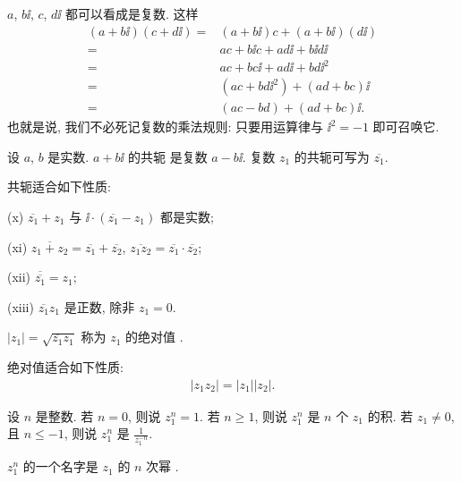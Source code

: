 \begin{remark}
    $a$, $b\ii$, $c$, $d\ii$ 都可以看成是复数. 这样
    \begin{align*}
        (a + b \ii) (c + d \ii)
        = {} & (a + b \ii) c + (a + b \ii) (d \ii)  \\
        = {} & ac + b \ii c + a d \ii + b \ii d \ii \\
        = {} & ac + bc\ii + ad\ii + bd\ii^2         \\
        = {} & (ac + bd\ii^2) + (ad + bc)\ii        \\
        = {} & (ac - bd) + (ad + bc)\ii.
    \end{align*}
    也就是说, 我们不必死记复数的乘法规则: 只要用运算律与 $\ii^2 = -1$ 即可召唤它.
\end{remark}

\begin{definition}
    设 $a$, $b$ 是实数. $a + b\ii$ 的共轭  是复数 $a - b\ii$. 复数 $z_1$ 的共轭可写为 $\overline{z_1}$.
\end{definition}

\begin{proposition}
    共轭适合如下性质:

    (x) $\overline{z_1} + z_1$ 与 $\ii \cdot (\overline{z_1} - z_1)$ 都是实数;

    (xi) $\overline{z_1 + z_2} = \overline{z_1} + \overline{z_2}$, $\overline{z_1 z_2} = \overline{z_1} \cdot \overline{z_2}$;

    (xii) $\overline{\overline{z_1}} = z_1$;

    (xiii) $\overline{z_1} z_1$ 是正数, 除非 $z_1 = 0$.
\end{proposition}

\begin{definition}
    $|z_1| = \sqrt{\overline{z_1} z_1}$ 称为 $z_1$ 的绝对值 .
\end{definition}

\begin{proposition}
    绝对值适合如下性质:
    \begin{align*}
        |z_1 z_2| = |z_1| |z_2|.
    \end{align*}
\end{proposition}

\begin{definition}
    设 $n$ 是整数. 若 $n=0$, 则说 $z_1^n = 1$. 若 $n \geq 1$, 则说 $z_1^n$ 是 $n$ 个 $z_1$ 的积. 若 $z_1 \neq 0$, 且 $n \leq -1$, 则说 $z_1^n$ 是 $\frac{1}{z_1^{-n}}$.

    $z_1^n$ 的一个名字是 $z_1$ 的 $n$ 次幂 .
\end{definition}

